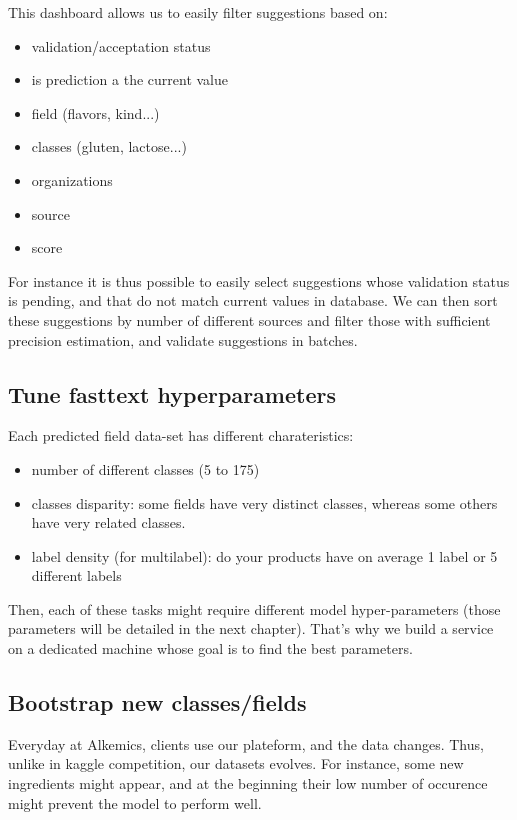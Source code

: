 This dashboard allows us to easily filter suggestions based on:
\begin{multicols}{2}
\begin{itemize} 
	\item validation/acceptation status
	\item is prediction a the current value
	\item field (flavors, kind...)
	\item classes (gluten, lactose...)
	\item organizations
	\item source 
	\item score 
\end{itemize}
\end{multicols}

For instance it is thus possible to easily select suggestions whose validation status is pending, and that do not match current values in database. We can then sort these suggestions by number of different sources and filter those with sufficient precision estimation, and validate suggestions in batches.


\subsection{Tune fasttext hyperparameters}

Each predicted field data-set has different charateristics:
\begin{itemize}
	\item number of different classes (5 to 175)
	\item classes disparity: some fields have very distinct classes, whereas some others have very related classes.
	\item label density (for multilabel): do your products have on average 1 label or 5 different labels
\end{itemize}

Then, each of these tasks might require different model hyper-parameters (those parameters will be detailed in the next chapter).
That's why we build a service on a dedicated machine whose goal is to find the best parameters.

\subsection{Bootstrap new classes/fields}

Everyday at Alkemics, clients use our plateform, and the data changes. Thus, unlike in kaggle competition, our datasets evolves.
For instance, some new ingredients might appear, and at the beginning their low number of occurence might prevent the model to perform well.

